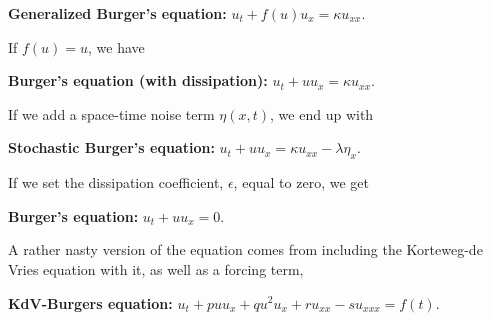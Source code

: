 \documentclass[undefended]{sfuthesis}
\begin{document}
\noindent\textbf{Generalized Burger's equation:} $u_t + f(u)u_x = \kappa u_{xx}$. \newline

If $f(u) = u$, we have \newline

\noindent\textbf{Burger's equation (with dissipation):} $u_t + uu_x = \kappa u_{xx}$. \newline

If we add a space-time noise term $\eta(x, t)$, we end up with \cite{diffusionApprox} \newline

\noindent\textbf{Stochastic Burger's equation:} $u_t + uu_x = \kappa u_{xx} - \lambda \eta_x$. \newline

If we set the dissipation coefficient, $\epsilon$, equal to zero, we get \newline

\noindent\textbf{Burger's equation:} $u_t + uu_x = 0$. \newline

A rather nasty version of the equation comes from including the Korteweg-de Vries equation \cite{KdV-Burger} with it, as well as a forcing term, \newline

\noindent\textbf{KdV-Burgers equation:} $u_t + puu_x + qu^2u_x + ru_{xx} - su_{xxx} = f(t)$. \newline
\end{document}
